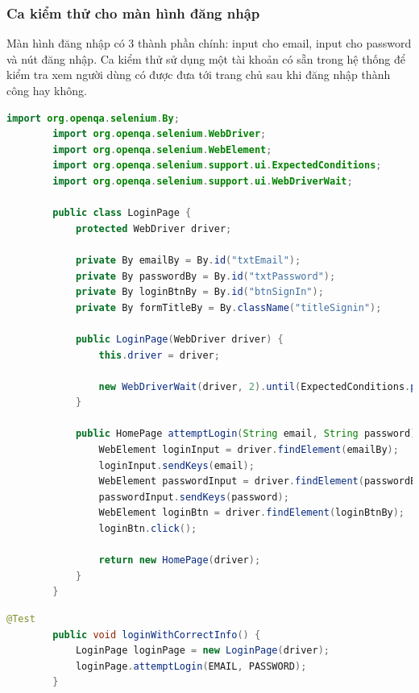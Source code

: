 \documentclass[./../main_file.tex]{subfiles}
\begin{document}

	\subsubsection{Ca kiểm thử cho màn hình đăng nhập}
	
	Màn hình đăng nhập có 3 thành phần chính: input cho email, input cho password và nút đăng nhập. Ca kiểm thử sử dụng một tài khoản có sẵn trong hệ thống để kiểm tra xem người dùng có được đưa tới trang chủ sau khi đăng nhập thành công hay không.
	
	\begin{lstlisting}[language=Java, caption=LoginPage.java]
		import org.openqa.selenium.By;
		import org.openqa.selenium.WebDriver;
		import org.openqa.selenium.WebElement;
		import org.openqa.selenium.support.ui.ExpectedConditions;
		import org.openqa.selenium.support.ui.WebDriverWait;
		
		public class LoginPage {
			protected WebDriver driver;
			
			private By emailBy = By.id("txtEmail");
			private By passwordBy = By.id("txtPassword");
			private By loginBtnBy = By.id("btnSignIn");
			private By formTitleBy = By.className("titleSignin");
			
			public LoginPage(WebDriver driver) {
				this.driver = driver;
				
				new WebDriverWait(driver, 2).until(ExpectedConditions.presenceOfElementLocated(formTitleBy));
			}
			
			public HomePage attemptLogin(String email, String password) {
				WebElement loginInput = driver.findElement(emailBy);
				loginInput.sendKeys(email);
				WebElement passwordInput = driver.findElement(passwordBy);
				passwordInput.sendKeys(password);
				WebElement loginBtn = driver.findElement(loginBtnBy);
				loginBtn.click();
				
				return new HomePage(driver);
			}
		}
	\end{lstlisting}

	\begin{lstlisting}[language=Java,caption=Ca kiểm thử đúng email và mật khẩu]
		@Test
		public void loginWithCorrectInfo() {
			LoginPage loginPage = new LoginPage(driver);
			loginPage.attemptLogin(EMAIL, PASSWORD);
		}
	\end{lstlisting}
\end{document}
